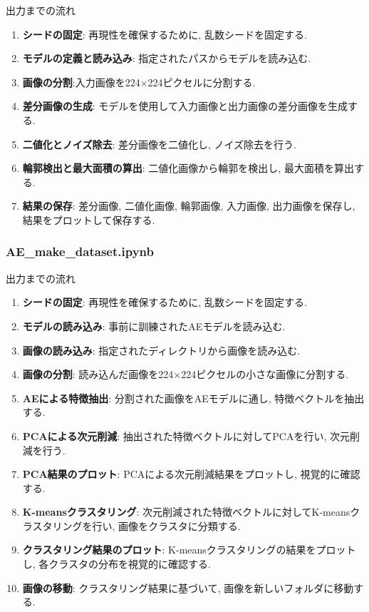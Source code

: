 \documentclass[a4paper, 12pt]{report}
\begin{document}
出力までの流れ
\begin{enumerate}
    \item \textbf{シードの固定}: 再現性を確保するために, 乱数シードを固定する. 
    \item \textbf{モデルの定義と読み込み}: 指定されたパスからモデルを読み込む. 
    \item \textbf{画像の分割}:入力画像を224×224ピクセルに分割する. 
    \item \textbf{差分画像の生成}: モデルを使用して入力画像と出力画像の差分画像を生成する. 
    \item \textbf{二値化とノイズ除去}: 差分画像を二値化し, ノイズ除去を行う. 
    \item \textbf{輪郭検出と最大面積の算出}: 二値化画像から輪郭を検出し, 最大面積を算出する. 
    \item \textbf{結果の保存}: 差分画像, 二値化画像, 輪郭画像, 入力画像, 出力画像を保存し, 結果をプロットして保存する. 
\end{enumerate}

\subsubsection{\textbf{AE\_make\_dataset.ipynb}}

出力までの流れ
\begin{enumerate}
    \item \textbf{シードの固定}: 再現性を確保するために, 乱数シードを固定する. 
    \item \textbf{モデルの読み込み}: 事前に訓練されたAEモデルを読み込む. 
    \item \textbf{画像の読み込み}: 指定されたディレクトリから画像を読み込む. 
    \item \textbf{画像の分割}: 読み込んだ画像を224×224ピクセルの小さな画像に分割する. 
    \item \textbf{AEによる特徴抽出}: 分割された画像をAEモデルに通し, 特徴ベクトルを抽出する. 
    \item \textbf{PCAによる次元削減}: 抽出された特徴ベクトルに対してPCAを行い, 次元削減を行う. 
    \item \textbf{PCA結果のプロット}: PCAによる次元削減結果をプロットし, 視覚的に確認する. 
    \item \textbf{K-meansクラスタリング}: 次元削減された特徴ベクトルに対してK-meansクラスタリングを行い, 画像をクラスタに分類する. 
    \item \textbf{クラスタリング結果のプロット}: K-meansクラスタリングの結果をプロットし, 各クラスタの分布を視覚的に確認する. 
    \item \textbf{画像の移動}: クラスタリング結果に基づいて, 画像を新しいフォルダに移動する. 
\end{enumerate}
\end{document}

